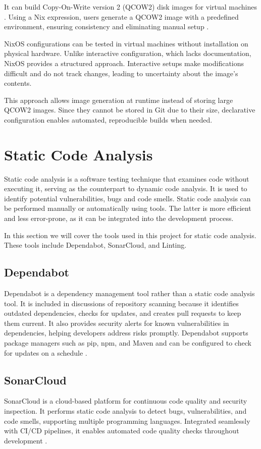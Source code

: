 It can build Copy-On-Write version 2 (QCOW2) disk images for virtual machines \cite{nixos_vm_configuration}. Using a Nix expression, users generate a QCOW2 image with a predefined environment, ensuring consistency and eliminating manual setup \cite{nix_language_tutorial}.

NixOS configurations can be tested in virtual machines without installation on physical hardware. Unlike interactive configuration, which lacks documentation, NixOS provides a structured approach. Interactive setups make modifications difficult and do not track changes, leading to uncertainty about the image's contents.

This approach allows image generation at runtime instead of storing large QCOW2 images. Since they cannot be stored in Git due to their size, declarative configuration enables automated, reproducible builds when needed.

\section{Static Code Analysis}
Static code analysis is a software testing technique that examines code without executing it, serving as the counterpart to dynamic code analysis. It is used to identify potential vulnerabilities, bugs and code smells. Static code analysis can be performed manually or automatically using tools. The latter is more efficient and less error-prone, as it can be integrated into the development process.

In this section we will cover the tools used in this project for static code analysis. These tools include Dependabot, SonarCloud, and Linting.

\subsection{Dependabot}
Dependabot is a dependency management tool rather than a static code analysis tool. It is included in discussions of repository scanning because it identifies outdated dependencies, checks for updates, and creates pull requests to keep them current. It also provides security alerts for known vulnerabilities in dependencies, helping developers address risks promptly. Dependabot supports package managers such as pip, npm, and Maven and can be configured to check for updates on a schedule \cite{GitHubDependabotVersion2025}.

\subsection{SonarCloud}
SonarCloud is a cloud-based platform for continuous code quality and security inspection. It performs static code analysis to detect bugs, vulnerabilities, and code smells, supporting multiple programming languages. Integrated seamlessly with CI/CD pipelines, it enables automated code quality checks throughout development \cite{SonarQubeDocs2025}.

